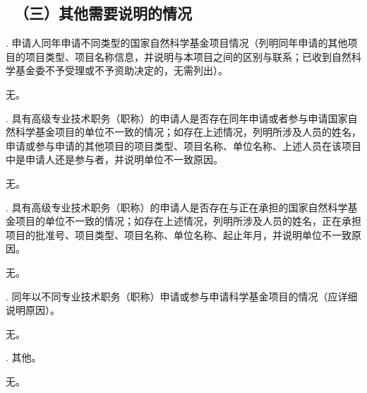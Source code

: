 {\color{MsBlue} \subsection{\texorpdfstring{\sihao \kaishu \quad \ （三）其他需要说明的情况}{（三）其他需要说明的情况}}}

{\sihao \color{MsBlue} . 申请人同年申请不同类型的国家自然科学基金项目情况（列明同年申请的其他项目的项目类型、项目名称信息，并说明与本项目之间的区别与联系；\hspace{-0.5em}已收到自然科学基金委不予受理或不予资助决定的，无需列出）。}

无。

\vskip 5mm


{\sihao \color{MsBlue} . 具有高级专业技术职务（职称）的申请人是否存在同年申请或者参与申请国家自然科学基金项目的单位不一致的情况；\hspace{-0.5em}如存在上述情况，列明所涉及人员的姓名，申请或参与申请的其他项目的项目类型、项目名称、单位名称、上述人员在该项目中是申请人还是参与者，并说明单位不一致原因。}

无。

\vskip 5mm


{\sihao \color{MsBlue} . 具有高级专业技术职务（职称）的申请人是否存在与正在承担的国家自然科学基金项目的单位不一致的情况；如存在上述情况，列明所涉及人员的姓名，正在承担项目的批准号、项目类型、项目名称、单位名称、起止年月，并说明单位不一致原因。}

无。

\vskip 5mm


{\sihao \color{MsBlue} . 同年以不同专业技术职务（职称）申请或参与申请科学基金项目的情况（应详细说明原因）。}

无。

\vskip 5mm


{\sihao \color{MsBlue} . 其他。}

无。
